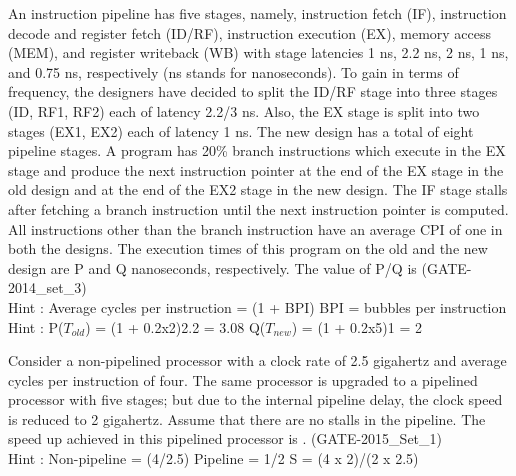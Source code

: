 \begin{questyle}
  \question  An instruction pipeline has five stages, namely, instruction fetch (IF), instruction
             decode and register fetch (ID/RF), instruction execution (EX), memory access (MEM), and
             register writeback (WB) with stage latencies 1 ns, 2.2 ns, 2 ns, 1 ns, and 0.75 ns,
             respectively (ns stands for nanoseconds). To gain in terms of frequency, the designers
             have decided to split the ID/RF stage into three stages (ID, RF1, RF2) each of
             latency 2.2/3 ns. Also, the EX stage is split into two stages (EX1, EX2) each of
             latency 1 ns. The new design has a total of eight pipeline stages. A program has 20\%
             branch instructions which execute in the EX stage and produce the next instruction
             pointer at the end of the EX stage in the old design and at the end of the EX2
             stage in the new design. The IF stage stalls after fetching a branch instruction
             until the next instruction pointer is computed. All instructions other than the
             branch instruction have an average CPI of one in both the designs. The execution
             times of this program on the old and the new design are P and Q nanoseconds, respectively.
             The value of P/Q is \fillin[1.54]  (GATE-2014\_set\_3) \\
             Hint : Average cycles per instruction = (1 + BPI) \quad BPI = bubbles per instruction \\
             Hint : P(\(T_{old}\)) = (1 + 0.2x2)2.2 = 3.08  \quad Q(\(T_{new}\)) = (1 + 0.2x5)1 = 2
\end{questyle}


\begin{questyle}
  \question  Consider a non-pipelined processor with a clock rate of 2.5 gigahertz and average
             cycles per instruction of four. The same processor is upgraded to a pipelined processor
             with five stages; but due to the internal pipeline delay, the clock speed is reduced to
             2 gigahertz. Assume that there are no stalls in the pipeline. The speed up achieved in
             this pipelined processor is \fillin[3.2]. (GATE-2015\_Set\_1) \\
             Hint : Non-pipeline = (4/2.5) \quad Pipeline = 1/2 \quad S = (4 x 2)/(2 x 2.5)
\end{questyle}

